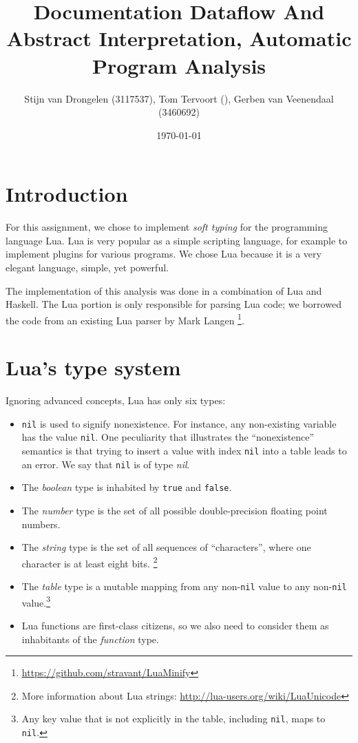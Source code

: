 \documentclass[a4paper]{article}
\title{Documentation Dataflow And Abstract Interpretation, Automatic Program Analysis}
\author{Stijn van Drongelen (3117537), Tom Tervoort (), Gerben van Veenendaal (3460692)}
\date{\today}
\begin{document}
\maketitle

\section*{Introduction}

For this assignment, we chose to implement \textit{soft typing} for the
programming language Lua. Lua is very popular as a simple scripting language,
for example to implement plugins for various programs. We chose Lua because it
is a very elegant language, simple, yet powerful.

The implementation of this analysis was done in a combination of Lua and
Haskell. The Lua portion is only responsible for parsing Lua code; we borrowed
the code from an existing Lua parser by Mark Langen%
\footnote{\url{https://github.com/stravant/LuaMinify}}.

\section*{Lua's type system}

Ignoring advanced concepts, Lua has only six types:

\begin{itemize}
\item \texttt{nil} is used to signify nonexistence. For instance, any
    non-existing variable has the value \texttt{nil}. One peculiarity that
    illustrates the ``nonexistence'' semantics is that trying to insert
    a value with index \texttt{nil} into a table leads to an error.
    We say that \texttt{nil} is of type \textit{nil}.
\item The \textit{boolean} type is inhabited by \texttt{true} and \texttt{false}.
\item The \textit{number} type is the set of all possible double-precision
    floating point numbers.
\item The \textit{string} type is the set of all sequences of ``characters'',
    where one character is at least eight bits.%
    \footnote{More information about Lua strings: \url{http://lua-users.org/wiki/LuaUnicode}}
\item The \textit{table} type is a mutable mapping from any non-\texttt{nil}
    value to any non-\texttt{nil} value.\footnote{Any key value that is not
    explicitly in the table, including \texttt{nil}, maps to \texttt{nil}.}
\item Lua functions are first-class citizens, so we also need to consider them
    as inhabitants of the \textit{function} type.
\end{itemize}
\end{document}
